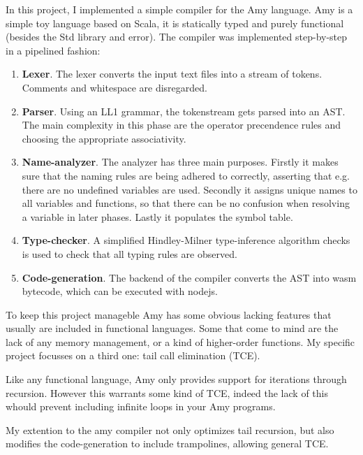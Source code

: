 In this project, I implemented a simple compiler for the Amy language. Amy is a simple toy language based on Scala, it is statically typed and purely functional (besides the Std library and error). The compiler was implemented step-by-step in a pipelined fashion:
\begin{enumerate}
	\item \textbf{Lexer}. The lexer converts the input text files into a stream of tokens. Comments and whitespace are disregarded.
	\item \textbf{Parser}. Using an LL1 grammar, the tokenstream gets parsed into an AST. The main complexity in this phase are the operator precendence rules and choosing the appropriate associativity.
	\item \textbf{Name-analyzer}. The analyzer has three main purposes. Firstly it makes sure that the naming rules are being adhered to correctly, asserting that e.g. there are no undefined variables are used. Secondly it assigns unique names to all variables and functions, so that there can be no confusion when resolving a variable in later phases. Lastly it populates the symbol table.
	\item \textbf{Type-checker}. A simplified Hindley-Milner type-inference algorithm checks is used to check that all typing rules are observed.
	\item \textbf{Code-generation}. The backend of the compiler converts the AST into wasm bytecode, which can be executed with nodejs.
\end{enumerate}

To keep this project manageble Amy has some obvious lacking features that usually are included in functional languages. Some that come to mind are the lack of any memory management, or a kind of higher-order functions. My specific project focusses on a third one: tail call elimination (TCE).

Like any functional language, Amy only provides support for iterations through recursion. However this warrants some kind of TCE, indeed the lack of this whould prevent including infinite loops in your Amy programs.

My extention to the amy compiler not only optimizes tail recursion, but also modifies the code-generation to include trampolines, allowing general TCE.